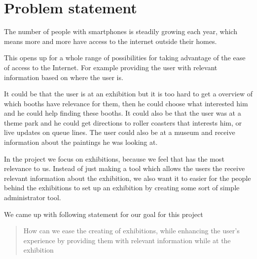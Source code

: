 \section*{Problem statement}

The number of people with smartphones is steadily growing each year, which means more and more have access to the internet outside their homes.

This opens up for a whole range of possibilities for taking advantage of the ease of access to the Internet. For example providing the user with relevant information based on where the user is. 

It could be that the user is at an exhibition but it is too hard to get a overview of which booths have relevance for them, then he could choose what interested him and he could help finding these booths. It could also be that the user was at a theme park and he could get directions to roller coasters that interests him, or live updates on queue lines. The user could also be at a museum and receive information about the paintings he was looking at.  

In the project we focus on exhibitions, because we feel that has the most relevance to us. Instead of just making a tool which allows the users the receive relevant information about the exhibition, we also want it to easier for the people behind the exhibitions to set up an exhibition by creating some sort of simple administrator tool.

We came up with following statement for our goal for this project 

\begin{quote}
How can we ease the creating of exhibitions, while enhancing the user's experience by providing them with relevant information while at the exhibition
\end{quote}

